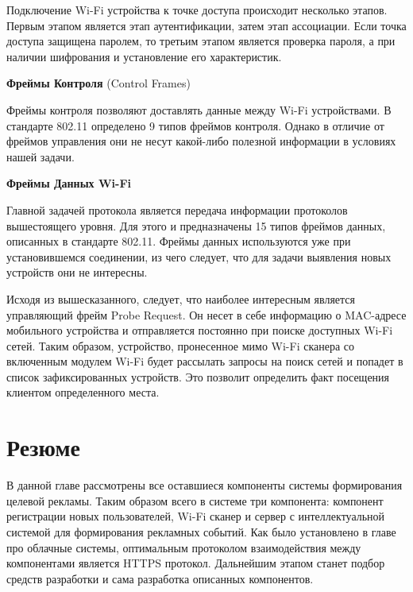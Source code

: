 Подключение Wi-Fi устройства к точке доступа происходит несколько этапов. Первым этапом является этап аутентификации, затем этап ассоциации. Если точка доступа защищена паролем, то третьим этапом является проверка пароля, а при наличии шифрования и установление его характеристик.

\textbf{Фреймы Контроля} (Control Frames)

Фреймы контроля позволяют доставлять данные между Wi-Fi устройствами. В стандарте 802.11 определено 9 типов фреймов контроля. Однако в отличие от фреймов управления они не несут какой-либо полезной информации в условиях нашей задачи.

\textbf{Фреймы Данных Wi-Fi}

Главной задачей протокола является передача информации протоколов вышестоящего уровня. Для этого и предназначены 15 типов фреймов данных, описанных в стандарте 802.11. Фреймы данных используются уже при установившемся соединении, из чего следует, что для задачи выявления новых устройств они не интересны.

Исходя из вышесказанного, следует, что наиболее интересным является управляющий фрейм Probe Request. Он несет в себе информацию о MAC-адресе мобильного устройства и отправляется постоянно при поиске доступных Wi-Fi сетей. Таким образом, устройство, пронесенное мимо Wi-Fi сканера со включенным модулем Wi-Fi будет рассылать запросы на поиск сетей и попадет в список зафиксированных устройств. Это позволит определить факт посещения клиентом определенного места.


\section{Резюме}

В данной главе рассмотрены все оставшиеся компоненты системы формирования целевой рекламы. Таким образом всего в системе три компонента: компонент регистрации новых пользователей, Wi-Fi сканер и сервер с интеллектуальной системой для формирования рекламных событий. Как было установлено в главе про облачные системы, оптимальным протоколом взаимодействия между компонентами является HTTPS протокол. Дальнейшим этапом станет подбор средств разработки и сама разработка описанных компонентов.
